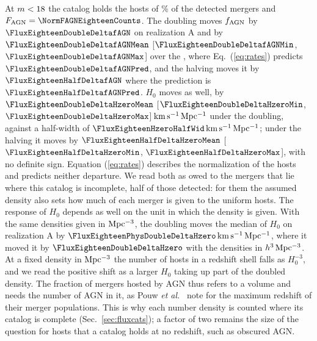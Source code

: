 \documentclass[aps,prd,reprint,twocolumn,superscriptaddress,nofootinbib,floatfix,nolongbibliography]{revtex4-2}
\newcommand{\kms}{{\rm km\,s^{-1}\,Mpc^{-1}}}
\newcommand{\fagn}{f_{\rm AGN}}
\begin{document}
At $m<18$ the catalog holds the hosts of
\MockEventCompEighteen\% of the detected mergers and $F_{\rm
AGN}=\NormFAGNEighteenCounts$. The doubling moves $\fagn$ by
$\FluxEighteenDoubleDeltafAGN$ on realization A and by
$\FluxEighteenDoubleDeltafAGNMean$ [$\FluxEighteenDoubleDeltafAGNMin$,
$\FluxEighteenDoubleDeltafAGNMax$] over the \NrealFluxDensity, where
Eq.~(\ref{eq:rates}) predicts $\FluxEighteenDoubleDeltafAGNPred$, and the
halving moves it by $\FluxEighteenHalfDeltafAGN$ where the prediction is
$\FluxEighteenHalfDeltafAGNPred$. $H_0$ moves as well, by
$\FluxEighteenDoubleDeltaHzeroMean$ [$\FluxEighteenDoubleDeltaHzeroMin$,
$\FluxEighteenDoubleDeltaHzeroMax$]$\,\kms$ under the doubling, against a
half-width of $\FluxEighteenHzeroHalfWid\,\kms$; under the halving it moves
by $\FluxEighteenHalfDeltaHzeroMean$ [$\FluxEighteenHalfDeltaHzeroMin$,
$\FluxEighteenHalfDeltaHzeroMax$], with no definite sign. Equation
(\ref{eq:rates}) describes the normalization of the hosts and predicts
neither departure. We read both as owed to the mergers that lie where this
catalog is incomplete, half of those detected: for them the assumed density
also sets how much of each merger is given to the uniform hosts. The
response of $H_0$ depends as well on the unit in which the density is given.
With the same densities given in ${\rm Mpc^{-3}}$, the doubling moves the
median of $H_0$ on realization A by
$\FluxEighteenPhysDoubleDeltaHzero\,\kms$, where it moved it by
$\FluxEighteenDoubleDeltaHzero$ with the densities in $h^3\,{\rm
Mpc^{-3}}$. At a fixed density in ${\rm Mpc^{-3}}$ the number of hosts in a
redshift shell falls as $H_0^{-3}$, and we read the positive shift as a
larger $H_0$ taking up part of the doubled density. The fraction of
mergers hosted by AGN thus refers to a volume and needs the number of AGN in
it, as Pouw \textit{et al.}~\cite{Pouw:2026lar} note for the maximum
redshift of their merger populations. This is why each number density is
counted where its catalog is complete (Sec.~\ref{sec:fluxcats}); a factor of
two remains the size of the question for hosts that a catalog holds at no
redshift, such as obscured AGN.
\end{document}

